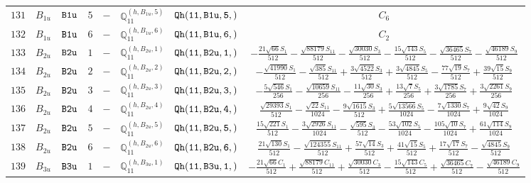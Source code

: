 \documentclass[fleqn,8pt]{jsarticle}
\begin{document}
\begin{table}[ht!]
\begin{center}
\begin{tabular}{cccccccc}
$ 131 $ & $ B_{1u} $ & $ {\tt B1u} $ & $ 5 $ & $ - $ & $ \mathbb{Q}_{11}^{(h,B_{1u},5)} $ & $ {\tt Qh(11,B1u,5,)} $ & $ C_{6} $ \\
$ 132 $ & $ B_{1u} $ & $ {\tt B1u} $ & $ 6 $ & $ - $ & $ \mathbb{Q}_{11}^{(h,B_{1u},6)} $ & $ {\tt Qh(11,B1u,6,)} $ & $ C_{2} $ \\
$ 133 $ & $ B_{2u} $ & $ {\tt B2u} $ & $ 1 $ & $ - $ & $ \mathbb{Q}_{11}^{(h,B_{2u},1)} $ & $ {\tt Qh(11,B2u,1,)} $ & $ - \frac{21 \sqrt{66} S_{1}}{512} - \frac{\sqrt{88179} S_{11}}{512} - \frac{\sqrt{30030} S_{3}}{512} - \frac{15 \sqrt{143} S_{5}}{512} - \frac{\sqrt{36465} S_{7}}{512} - \frac{\sqrt{46189} S_{9}}{512} $ \\
$ 134 $ & $ B_{2u} $ & $ {\tt B2u} $ & $ 2 $ & $ - $ & $ \mathbb{Q}_{11}^{(h,B_{2u},2)} $ & $ {\tt Qh(11,B2u,2,)} $ & $ - \frac{\sqrt{41990} S_{1}}{512} - \frac{\sqrt{385} S_{11}}{512} + \frac{3 \sqrt{4522} S_{3}}{512} + \frac{3 \sqrt{4845} S_{5}}{512} - \frac{77 \sqrt{19} S_{7}}{512} + \frac{39 \sqrt{15} S_{9}}{512} $ \\
$ 135 $ & $ B_{2u} $ & $ {\tt B2u} $ & $ 3 $ & $ - $ & $ \mathbb{Q}_{11}^{(h,B_{2u},3)} $ & $ {\tt Qh(11,B2u,3,)} $ & $ - \frac{5 \sqrt{546} S_{1}}{256} - \frac{\sqrt{10659} S_{11}}{256} - \frac{11 \sqrt{30} S_{3}}{256} + \frac{13 \sqrt{7} S_{5}}{256} + \frac{3 \sqrt{1785} S_{7}}{256} + \frac{3 \sqrt{2261} S_{9}}{256} $ \\
$ 136 $ & $ B_{2u} $ & $ {\tt B2u} $ & $ 4 $ & $ - $ & $ \mathbb{Q}_{11}^{(h,B_{2u},4)} $ & $ {\tt Qh(11,B2u,4,)} $ & $ \frac{\sqrt{29393} S_{1}}{512} - \frac{\sqrt{22} S_{11}}{1024} - \frac{9 \sqrt{1615} S_{3}}{512} + \frac{5 \sqrt{13566} S_{5}}{1024} - \frac{7 \sqrt{1330} S_{7}}{1024} + \frac{9 \sqrt{42} S_{9}}{1024} $ \\
$ 137 $ & $ B_{2u} $ & $ {\tt B2u} $ & $ 5 $ & $ - $ & $ \mathbb{Q}_{11}^{(h,B_{2u},5)} $ & $ {\tt Qh(11,B2u,5,)} $ & $ \frac{15 \sqrt{221} S_{1}}{512} - \frac{3 \sqrt{2926} S_{11}}{1024} - \frac{\sqrt{595} S_{3}}{512} - \frac{53 \sqrt{102} S_{5}}{1024} - \frac{105 \sqrt{10} S_{7}}{1024} + \frac{61 \sqrt{114} S_{9}}{1024} $ \\
$ 138 $ & $ B_{2u} $ & $ {\tt B2u} $ & $ 6 $ & $ - $ & $ \mathbb{Q}_{11}^{(h,B_{2u},6)} $ & $ {\tt Qh(11,B2u,6,)} $ & $ \frac{21 \sqrt{130} S_{1}}{512} - \frac{\sqrt{124355} S_{11}}{512} + \frac{57 \sqrt{14} S_{3}}{512} + \frac{41 \sqrt{15} S_{5}}{512} + \frac{17 \sqrt{17} S_{7}}{512} - \frac{\sqrt{4845} S_{9}}{512} $ \\
$ 139 $ & $ B_{3u} $ & $ {\tt B3u} $ & $ 1 $ & $ - $ & $ \mathbb{Q}_{11}^{(h,B_{3u},1)} $ & $ {\tt Qh(11,B3u,1,)} $ & $ - \frac{21 \sqrt{66} C_{1}}{512} + \frac{\sqrt{88179} C_{11}}{512} + \frac{\sqrt{30030} C_{3}}{512} - \frac{15 \sqrt{143} C_{5}}{512} + \frac{\sqrt{36465} C_{7}}{512} - \frac{\sqrt{46189} C_{9}}{512} $ \\

\end{tabular}
\end{center}
\end{table}
\end{document}
